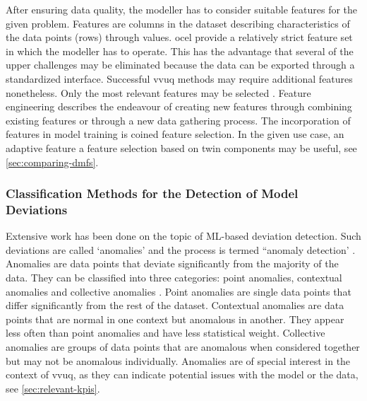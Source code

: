 After ensuring data quality, the modeller has to consider suitable features for the given problem. Features are columns in the dataset describing characteristics of the data points (rows) through values. \gls{ocel} provide a relatively strict feature set in which the modeller has to operate. This has the advantage that several of the upper challenges may be eliminated because the data can be exported through a standardized interface. Successful \gls{vvuq} methods may require additional features nonetheless. Only the most relevant features may be selected \autocite{geron2022hands}. Feature engineering describes the endeavour of creating new features through combining existing features or through a new data gathering process. The incorporation of features in model training is coined feature selection. In the given use case, an adaptive feature a feature selection based on twin components may be useful, see \autoref{sec:comparing-dmfs}.

\subsubsection*{Classification Methods for the Detection of Model Deviations}
\label{sec:classification-methods}
Extensive work has been done on the topic of ML-based deviation detection. Such deviations are called `anomalies' and the process is termed ``anomaly detection' \autocite{kharitonov2022comparative}. Anomalies are data points that deviate significantly from the majority of the data. They can be classified into three categories: point anomalies, contextual anomalies and collective anomalies \autocite{chandola2009anomaly}. Point anomalies are single data points that differ significantly from the rest of the dataset. Contextual anomalies are data points that are normal in one context but anomalous in another. They appear less often than point anomalies and have less statistical weight. Collective anomalies are groups of data points that are anomalous when considered together but may not be anomalous individually. Anomalies are of special interest in the context of \gls{vvuq}, as they can indicate potential issues with the model or the data, see \autoref{sec:relevant-kpis}.

